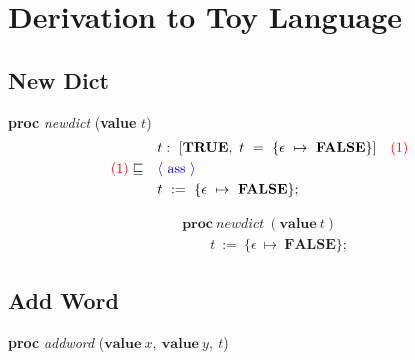 \documentclass[a4paper, fleqn]{article}
\newcommand{\reason}[1]{\text{\textcolor{blue}{$\langle$ #1 $\rangle$}}}
\newcommand{\num}[1]{\text{\textcolor{red}{(#1)}}}
\begin{document}
\clearpage\section{Derivation to Toy Language}
\subsection{New Dict}
\textbf{proc} \textit{newdict} (\textbf{value} $t$)
\begin{align*}
		&\quad t:\ [\textbf{TRUE},\ t\ =\ \{\epsilon\ \mapsto\ \textbf{FALSE}\}]\quad\num{1} \\
		\num{1}\sqsubseteq&\quad\reason{ass} \\
		&\quad t\ :=\ \{\epsilon\ \mapsto\ \textbf{FALSE}\};
\end{align*}

\begin{align*}
		&\textbf{proc}\ \textit{newdict}\ (\textbf{value}\ t) \\
		&\qquad t\ :=\ \{\epsilon\ \mapsto\ \textbf{FALSE}\};
\end{align*}



\subsection{Add Word}
\textbf{proc} \textit{addword} ($\textbf{value}\ x,\ \textbf{value}\ y,\ t$)
\end{document}
